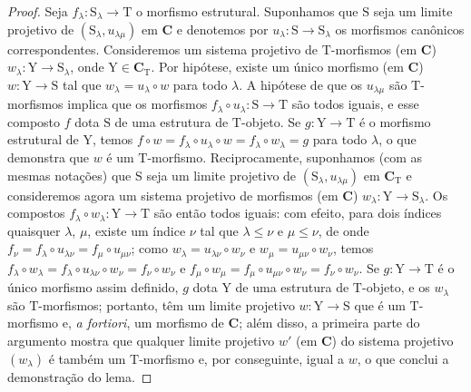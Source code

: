 \begin{proof}
Seja $f_\lambda:\mathrm{S}_\lambda\to\mathrm{T}$ o morfismo estrutural.
Suponhamos que $\mathrm{S}$ seja um limite projetivo de $(\mathrm{S}_\lambda,u_{\lambda\mu})$ em $\mathbf{C}$ e denotemos por $u_\lambda:\mathrm{S}\to\mathrm{S}_\lambda$ os morfismos canônicos correspondentes.
Consideremos um sistema projetivo de $\mathrm{T}$-morfismos (em $\mathbf{C}$) $w_\lambda:\mathrm{Y}\to\mathrm{S}_\lambda$, onde $\mathrm{Y}\in\mathbf{C}_\mathrm{T}$.
Por hipótese, existe um único morfismo (em $\mathbf{C}$) $w:\mathrm{Y}\to\mathrm{S}$ tal que $w_\lambda=u_\lambda\circ w$ para todo $\lambda$.
A hipótese de que os $u_{\lambda\mu}$ são $\mathrm{T}$-morfismos implica que os morfismos $f_\lambda\circ u_\lambda:\mathrm{S}\to\mathrm{T}$ são todos iguais, e esse composto $f$ dota $\mathrm{S}$ de uma estrutura de $\mathrm{T}$-objeto.
Se $g:\mathrm{Y}\to\mathrm{T}$ é o morfismo estrutural de $\mathrm{Y}$, temos $f\circ w=f_\lambda\circ u_\lambda\circ w=f_\lambda\circ w_\lambda=g$ para todo $\lambda$, o que demonstra que $w$ é um $\mathrm{T}$-morfismo.
Reciprocamente, suponhamos (com as mesmas notações) que $\mathrm{S}$ seja um limite projetivo de $(\mathrm{S}_\lambda,u_{\lambda\mu})$ em $\mathbf{C}_\mathrm{T}$ e consideremos agora um sistema projetivo de morfismos (em $\mathbf{C}$) $w_\lambda:\mathrm{Y}\to\mathrm{S}_\lambda$.
Os compostos $f_\lambda\circ w_\lambda:\mathrm{Y}\to\mathrm{T}$ são então todos iguais: com efeito, para dois índices quaisquer $\lambda$, $\mu$, existe um índice $\nu$ tal que $\lambda\leqslant\nu$ e $\mu\leqslant\nu$, de onde $f_\nu=f_\lambda\circ u_{\lambda\nu}=f_\mu\circ u_{\mu\nu}$; como $w_\lambda=u_{\lambda\nu}\circ w_\nu$ e $w_\mu=u_{\mu\nu}\circ w_\nu$, temos $f_\lambda\circ w_\lambda=f_\lambda\circ u_{\lambda\nu}\circ w_\nu=f_\nu\circ w_\nu$ e $f_\mu\circ w_\mu=f_\mu\circ u_{\mu\nu}\circ w_\nu=f_\nu\circ w_\nu$.
Se $g:\mathrm{Y}\to\mathrm{T}$ é o único morfismo assim definido, $g$ dota $\mathrm{Y}$ de uma estrutura de $\mathrm{T}$-objeto, e os $w_\lambda$ são $\mathrm{T}$-morfismos; portanto, têm um limite projetivo $w:\mathrm{Y}\to\mathrm{S}$ que é um $\mathrm{T}$-morfismo e, \emph{a fortiori}, um morfismo de $\mathbf{C}$; além disso, a primeira parte do argumento mostra que qualquer limite projetivo $w'$ (em $\mathbf{C}$) do sistema projetivo $(w_\lambda)$ é também um $\mathrm{T}$-morfismo e, por conseguinte, igual a $w$, o que conclui a demonstração do lema.
\end{proof}

